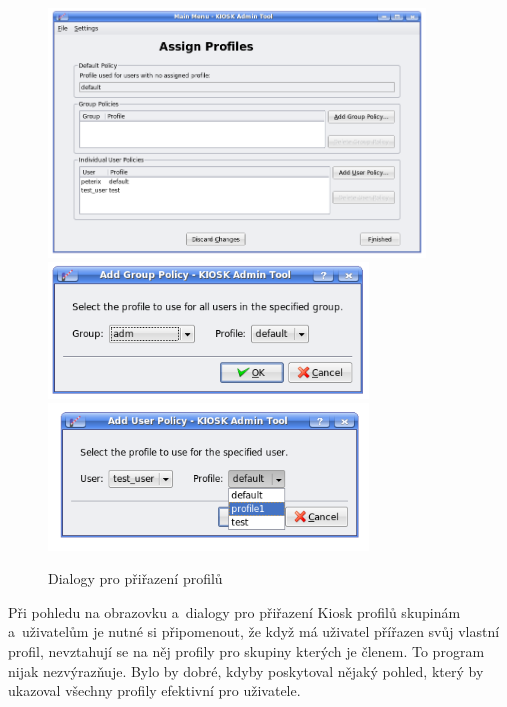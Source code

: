 \begin{figure}[h]
    \centering
    \includegraphics[width=10cm]{obrazky/KioskToolKDE3/prirazeni_profilu.png}
    \includegraphics[width=8.5cm]{obrazky/KioskToolKDE3/prirazeni_profilu_skupine.png}
    \includegraphics[width=8.5cm]{obrazky/KioskToolKDE3/prirazeni_profilu_uzivateli.png}
    \caption{Dialogy pro přiřazení profilů}
    \label{fig:kt3_prirazeni}
\end{figure}
Při pohledu na obrazovku a~dialogy pro přiřazení Kiosk profilů skupinám a~uživatelům je nutné si připomenout, že když má uživatel přířazen svůj vlastní profil, nevztahují se na něj profily pro skupiny kterých je členem. To program nijak nezvýrazňuje. Bylo by dobré, kdyby poskytoval nějaký pohled, který by ukazoval všechny profily efektivní pro uživatele.

